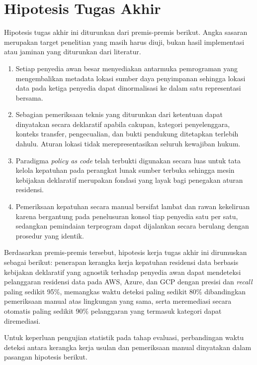 \section{Hipotesis Tugas Akhir}

Hipotesis tugas akhir ini diturunkan dari premis-premis berikut. Angka sasaran merupakan target penelitian yang masih harus diuji, bukan hasil implementasi atau jaminan yang diturunkan dari literatur.

\begin{enumerate}

\item Setiap penyedia awan besar menyediakan antarmuka pemrograman yang mengembalikan metadata lokasi sumber daya penyimpanan sehingga lokasi data pada ketiga penyedia dapat dinormalisasi ke dalam satu representasi bersama.

\item Sebagian pemeriksaan teknis yang diturunkan dari ketentuan dapat dinyatakan secara deklaratif apabila cakupan, kategori penyelenggara, konteks transfer, pengecualian, dan bukti pendukung ditetapkan terlebih dahulu. Aturan lokasi tidak merepresentasikan seluruh kewajiban hukum.

\item Paradigma \textit{policy as code} telah terbukti digunakan secara luas untuk tata kelola kepatuhan pada perangkat lunak sumber terbuka \autocite{foalem2026} sehingga mesin kebijakan deklaratif merupakan fondasi yang layak bagi penegakan aturan residensi.

\item Pemeriksaan kepatuhan secara manual bersifat lambat dan rawan kekeliruan karena bergantung pada penelusuran konsol tiap penyedia satu per satu, sedangkan pemindaian terprogram dapat dijalankan secara berulang dengan prosedur yang identik.

\end{enumerate}

Berdasarkan premis-premis tersebut, hipotesis kerja tugas akhir ini dirumuskan sebagai berikut: penerapan kerangka kerja kepatuhan residensi data berbasis kebijakan deklaratif yang agnostik terhadap penyedia awan dapat mendeteksi pelanggaran residensi data pada AWS, Azure, dan GCP dengan presisi dan \textit{recall} paling sedikit 95\%, memangkas waktu deteksi paling sedikit 80\% dibandingkan pemeriksaan manual atas lingkungan yang sama, serta meremediasi secara otomatis paling sedikit 90\% pelanggaran yang termasuk kategori dapat diremediasi.

Untuk keperluan pengujian statistik pada tahap evaluasi, perbandingan waktu deteksi antara kerangka kerja usulan dan pemeriksaan manual dinyatakan dalam pasangan hipotesis berikut.

